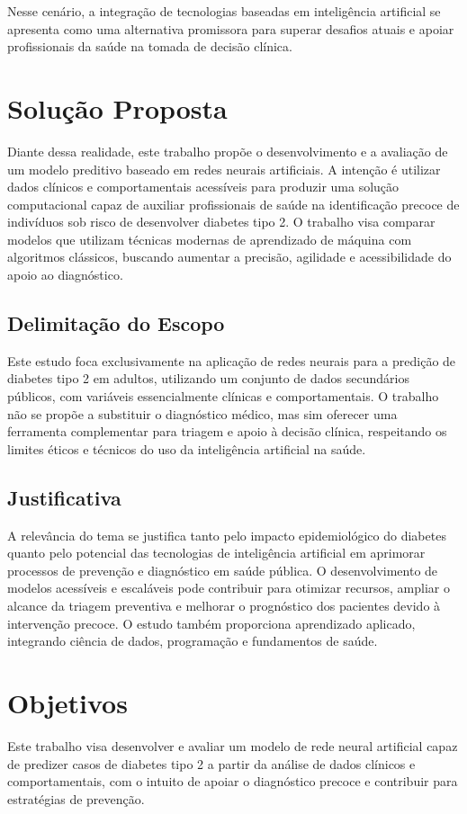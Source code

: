 Nesse cenário, a integração de tecnologias baseadas em inteligência artificial se apresenta como uma alternativa promissora para superar desafios atuais e apoiar profissionais da saúde na tomada de decisão clínica.

\section{Solução Proposta}
Diante dessa realidade, este trabalho propõe o desenvolvimento e a avaliação de um modelo preditivo baseado em redes neurais artificiais. A intenção é utilizar dados clínicos e comportamentais acessíveis para produzir uma solução computacional capaz de auxiliar profissionais de saúde na identificação precoce de indivíduos sob risco de desenvolver diabetes tipo 2. O trabalho visa comparar modelos que utilizam técnicas modernas de aprendizado de máquina com algoritmos clássicos, buscando aumentar a precisão, agilidade e acessibilidade do apoio ao diagnóstico.

\subsection{Delimitação do Escopo}
Este estudo foca exclusivamente na aplicação de redes neurais para a predição de diabetes tipo 2 em adultos, utilizando um conjunto de dados secundários públicos, com variáveis essencialmente clínicas e comportamentais. O trabalho não se propõe a substituir o diagnóstico médico, mas sim oferecer uma ferramenta complementar para triagem e apoio à decisão clínica, respeitando os limites éticos e técnicos do uso da inteligência artificial na saúde.

\subsection{Justificativa}
A relevância do tema se justifica tanto pelo impacto epidemiológico do diabetes quanto pelo potencial das tecnologias de inteligência artificial em aprimorar processos de prevenção e diagnóstico em saúde pública. O desenvolvimento de modelos acessíveis e escaláveis pode contribuir para otimizar recursos, ampliar o alcance da triagem preventiva e melhorar o prognóstico dos pacientes devido à intervenção precoce. O estudo também proporciona aprendizado aplicado, integrando ciência de dados, programação e fundamentos de saúde.

\section{Objetivos}
Este trabalho visa desenvolver e avaliar um modelo de rede neural artificial capaz de predizer casos de diabetes tipo 2 a partir da análise de dados clínicos e comportamentais, com o intuito de apoiar o diagnóstico precoce e contribuir para estratégias de prevenção.

